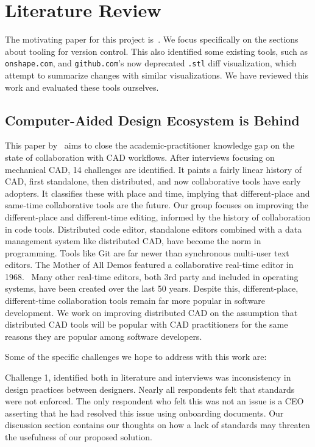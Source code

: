 \documentclass[sigconf,authorversion,nonacm]{acmart}
\begin{document}
\section{Literature Review}

The motivating paper for this project is~\citet{cheng2023age}.
We focus specifically on the sections about tooling for version control.
This also identified some existing tools, such as \texttt{onshape.com}, and \texttt{github.com}'s now deprecated \texttt{.stl} diff visualization, which attempt to summarize changes with similar visualizations.
We have reviewed this work and evaluated these tools ourselves.

\subsection{Computer-Aided Design Ecosystem is Behind}

This paper by~\citet{cheng2023age} aims to close the academic-practitioner knowledge gap on the state of collaboration with CAD workflows.
After interviews focusing on mechanical CAD, 14 challenges are identified.
It paints a fairly linear history of CAD, first standalone, then distributed, and now collaborative tools have early adopters.
It classifies these with place and time, implying that different-place and same-time collaborative tools are the future.
Our group focuses on improving the different-place and different-time editing, informed by the history of collaboration in code tools.
Distributed code editor, standalone editors combined with a data management system like distributed CAD, have become the norm in programming.
Tools like Git are far newer than synchronous multi-user text editors.
The Mother of All Demos featured a collaborative real-time editor in 1968.~\cite{motherofalldemos}
Many other real-time editors, both 3rd party and included in operating systems, have been created over the last 50 years.
Despite this, different-place, different-time collaboration tools remain far more popular in software development.
We work on improving distributed CAD on the assumption that distributed CAD tools will be popular with CAD practitioners for the same reasons they are popular among software developers.

Some of the specific challenges we hope to address with this work are:

Challenge 1, identified both in literature and interviews was inconsistency in design practices between designers.
Nearly all respondents felt that standards were not enforced.
The only respondent who felt this was not an issue is a CEO asserting that he had resolved this issue using onboarding documents.
Our discussion section contains our thoughts on how a lack of standards may threaten the usefulness of our proposed solution.
\end{document}
